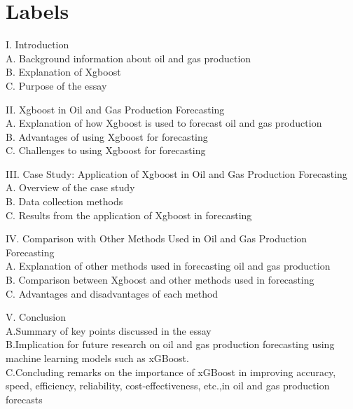 \section{Labels}
\label{sec:Labels}


I. Introduction 
\\
A. Background information about oil and gas production
\\
B. Explanation of Xgboost 
\\
C. Purpose of the essay

II. Xgboost in Oil and Gas Production Forecasting 
\\
A. Explanation of how Xgboost is used to forecast oil and gas production 
\\
B. Advantages of using Xgboost for forecasting 
\\
C. Challenges to using Xgboost for forecasting


III. Case Study: Application of Xgboost in Oil and Gas Production Forecasting
\\
A. Overview of the case study 
\\
B. Data collection methods 
\\
C. Results from the application of Xgboost in forecasting

IV. Comparison with Other Methods Used in Oil and Gas Production Forecasting
\\
A. Explanation of other methods used in forecasting oil and gas production 
\\
B. Comparison between Xgboost and other methods used in forecasting 
\\
C. Advantages and disadvantages of each method

V. Conclusion 
\\
A.Summary of key points discussed in the essay 
\\
B.Implication for future research on oil and gas production forecasting using machine learning models such as xGBoost.
\\
C.Concluding remarks on the importance of xGBoost in improving accuracy, speed, efficiency, reliability, cost-effectiveness, etc.,in oil and gas production forecasts
